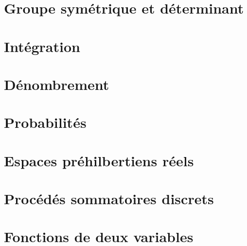 \documentclass[a4paper, 10pt, twoside]{report}
\begin{document}
\chapter{Groupe symétrique et déterminant}

    
        
\chapter{Intégration}

    

\chapter{Dénombrement}

    
        
\chapter{Probabilités}

    

\chapter{Espaces préhilbertiens réels}

    

\chapter{Procédés sommatoires discrets}

    

\chapter{Fonctions de deux variables}

    





\tableofcontents

    
\end{document}
